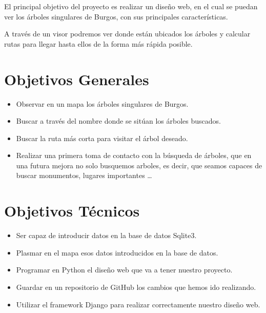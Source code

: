 
El principal objetivo del proyecto es realizar un diseño web, en el cual se puedan ver los árboles singulares de Burgos, con sus principales características.

A través de un visor podremos ver donde están ubicados los árboles y calcular rutas para llegar hasta ellos de la forma más rápida posible.
\section{Objetivos Generales}
\begin{itemize}
	\item Observar en un mapa los árboles singulares de Burgos.
	\item Buscar a través del nombre donde se sitúan los árboles buscados.
	\item Buscar la ruta más corta para visitar el árbol deseado.
	\item Realizar una primera toma de contacto con la búsqueda de árboles, que en una futura mejora no solo busquemos arboles, es decir, que seamos capaces de buscar monumentos, lugares importantes \ldots 
\end{itemize}

\section{Objetivos Técnicos}
\begin{itemize}
	\item Ser capaz de introducir datos en la base de datos Sqlite3.
	\item Plasmar en el mapa esos datos introducidos en la base de datos. 
	\item Programar en Python el diseño web que va a tener nuestro proyecto.
	\item Guardar en un repositorio de GitHub los cambios que hemos ido realizando.
	\item Utilizar el framework Django para realizar correctamente nuestro diseño web.
	 
\end{itemize}